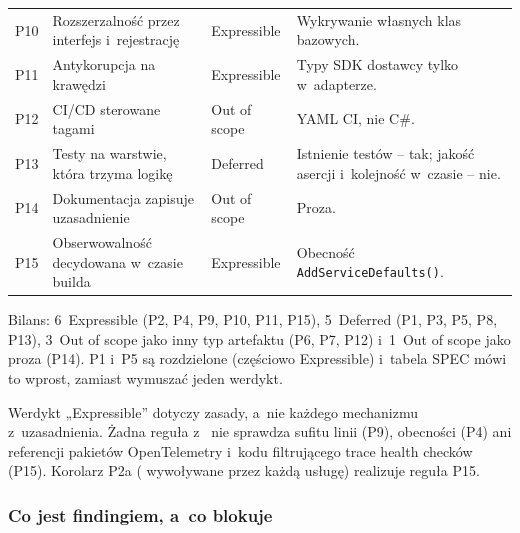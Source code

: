 \begin{xltabular}{\linewidth}{@{}l >{\raggedright\arraybackslash}p{4.4cm} >{\raggedright\arraybackslash}p{2.0cm} >{\raggedright\arraybackslash}X@{}}
P10 & Rozszerzalność przez interfejs i~rejestrację & Expressible & Wykrywanie własnych klas bazowych. \\
P11 & Antykorupcja na krawędzi & Expressible & Typy SDK dostawcy tylko w~adapterze. \\
P12 & CI/CD sterowane tagami & Out of scope & YAML CI, nie C\#. \\
P13 & Testy na warstwie, która trzyma logikę & Deferred & Istnienie testów -- tak; jakość asercji i~kolejność w~czasie -- nie. \\
P14 & Dokumentacja zapisuje uzasadnienie & Out of scope & Proza. \\
P15 & Obserwowalność decydowana w~czasie builda & Expressible & Obecność \texttt{AddServiceDefaults()}. \\
\bottomrule
\end{xltabular}

Bilans: 6~Expressible (P2, P4, P9, P10, P11, P15), 5~Deferred (P1, P3, P5, P8, P13),
3~Out of scope jako inny typ artefaktu (P6, P7, P12) i~1~Out of scope jako proza (P14).
P1 i~P5 są rozdzielone (częściowo Expressible) i~tabela SPEC mówi to wprost, zamiast
wymuszać jeden werdykt.

Werdykt „Expressible” dotyczy zasady, a~nie każdego mechanizmu z~uzasadnienia. Żadna reguła
z~ nie sprawdza sufitu linii  (P9),
obecności  (P4) ani referencji pakietów OpenTelemetry i~kodu
filtrującego trace health checków (P15). Korolarz P2a (
wywoływane przez każdą usługę) realizuje reguła P15.

\subsubsection{Co jest findingiem, a~co blokuje}

